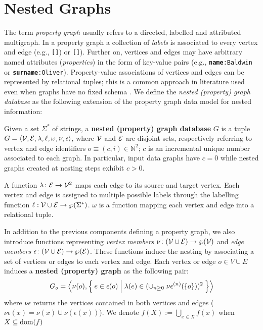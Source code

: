 
\section{Nested Graphs}
\label{sec:model}
The term \textit{property graph}  \cite{angles12} usually refers to a directed, labelled and attributed multigraph. 
In a property graph a collection of \textit{labels} \cite{bergamimm17} is associated to every vertex and edge (e.g., \texttt{[}\texttt{]}) or \texttt{[}\texttt{]}). Further on, vertices and edges may have arbitrary named attributes (\textit{properties}) in the form of key-value pairs (e.g., \texttt{\textbf{name}:Baldwin} or \texttt{\textbf{surname}:Oliver}). Property-value associations of vertices and edges can be represented by relational tuples; this is a common approach in literature used even when graphs have no fixed schema \cite{angles12}. We define the\textit{ nested (property) graph database} as the following extension of the property graph data model for nested information:

\begin{definition}
Given a set $\Sigma^*$ of strings,
	a \textbf{nested (property) graph database} $G$ is a tuple $G=\Braket{\mathcal{V}, \mathcal{E}, \lambda,\ell,\omega,\nu,\epsilon}$, where $\mathcal{V}$ and $\mathcal{E}$ are disjoint sets, respectively referring to vertex and edge identifiers $o\equiv(c,i)\in\mathbb{N}^2$; $c$ is an incremental unique number associated to each graph. In particular, input data graphs have $c=0$ while  nested graphs created at nesting steps exhibit $c>0$. 
	
	A function $\lambda\colon \mathcal{E}\to \mathcal{V}^2$ maps each edge to its source and target vertex. Each vertex and edge is assigned to multiple possible labels through the labelling function $\ell:\mathcal{V}\cup \mathcal{E}\to \wp(\Sigma^*)$.  $\omega$ is a function mapping each vertex and edge into a relational tuple.
	
	In addition to the previous components defining a property graph, we also introduce functions representing \textit{vertex members} $\nu\colon (\mathcal{V}\cup \mathcal{E})\to\wp(\mathcal{V})$ and \textit{edge members} $\epsilon\colon(\mathcal{V}\cup \mathcal{E})\to \wp(\mathcal{E})$. These functions induce the nesting by associating a set of vertices or edges to each vertex and edge. Each vertex or edge $o\in V\cup E$ induces a \textbf{nested (property) graph} as the following pair:
	\[G_o=\Braket{\nu(o),\Set{e\in\epsilon(o)|\lambda(e)\in (\cup_{n\geq 0}\;{\nu\epsilon}^{(n)}(\{o\}))^2}}\]
	where ${\nu\epsilon}$ returns the vertices contained in both vertices and edges ($\nu\epsilon(x)=\nu(x)\cup \nu(\epsilon(x))$). We denote $f(X){:=}\bigcup_{x\in X} f(x)$ when $X\subseteq \textup{dom}(f)$
\end{definition}


